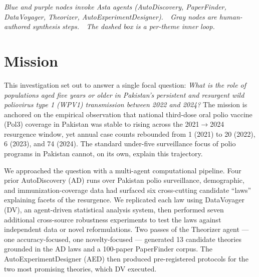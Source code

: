 \documentclass[11pt]{article}
\begin{document}
\begin{titlepage}
{%
}

\vspace*{\fill}
\begin{center}
\footnotesize\itshape\color{gray!50!black}
Blue and purple nodes invoke Asta agents (AutoDiscovery, PaperFinder, DataVoyager, Theorizer, AutoExperimentDesigner).\ \ Gray nodes are human-authored synthesis steps.\ \ The dashed box is a per-theme inner loop.
\end{center}
\end{titlepage}

\tableofcontents
\newpage

\section{Mission}

This investigation set out to answer a single focal question: \emph{What is the role of populations aged five years or older in Pakistan's persistent and resurgent wild poliovirus type 1 (WPV1) transmission between 2022 and 2024?} The mission is anchored on the empirical observation that national third-dose oral polio vaccine (Pol3) coverage in Pakistan was stable to rising across the 2021$\to$2024 resurgence window, yet annual case counts rebounded from 1 (2021) to 20 (2022), 6 (2023), and 74 (2024). The standard under-five surveillance focus of polio programs in Pakistan cannot, on its own, explain this trajectory.

We approached the question with a multi-agent computational pipeline. Four prior AutoDiscovery (AD) runs over Pakistan polio surveillance, demographic, and immunization-coverage data had surfaced six cross-cutting candidate ``laws'' explaining facets of the resurgence. We replicated each law using DataVoyager (DV), an agent-driven statistical analysis system, then performed seven additional cross-source robustness experiments to test the laws against independent data or novel reformulations. Two passes of the Theorizer agent --- one accuracy-focused, one novelty-focused --- generated 13 candidate theories grounded in the AD laws and a 100-paper PaperFinder corpus. The AutoExperimentDesigner (AED) then produced pre-registered protocols for the two most promising theories, which DV executed.
\end{document}
